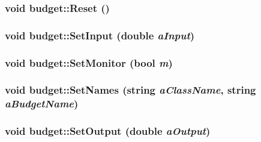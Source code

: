 \label{classbudget_a5a09b3d53e4bb109f1413b99a634b55d}
\hypertarget{classbudget_a47533e4ef9b8907303904da10f934f74}{
\subsubsection[{Reset}]{\setlength{\rightskip}{0pt plus 5cm}void budget::Reset ()}}
\label{classbudget_a47533e4ef9b8907303904da10f934f74}
\hypertarget{classbudget_a885260b83f245dee43a1e6ee70a4c68d}{
\subsubsection[{SetInput}]{\setlength{\rightskip}{0pt plus 5cm}void budget::SetInput (double {\em aInput})}}
\label{classbudget_a885260b83f245dee43a1e6ee70a4c68d}
\hypertarget{classbudget_a53c534dce354449261700e9c295d7e7e}{
\subsubsection[{SetMonitor}]{\setlength{\rightskip}{0pt plus 5cm}void budget::SetMonitor (bool {\em m})}}
\label{classbudget_a53c534dce354449261700e9c295d7e7e}
\hypertarget{classbudget_ada0ca75f0dd9d8a6d0dfd5fcbd666653}{
\subsubsection[{SetNames}]{\setlength{\rightskip}{0pt plus 5cm}void budget::SetNames (string {\em aClassName}, \/  string {\em aBudgetName})}}
\label{classbudget_ada0ca75f0dd9d8a6d0dfd5fcbd666653}
\hypertarget{classbudget_a28fc928b65aef6475ad0dee374bbb7f2}{
\subsubsection[{SetOutput}]{\setlength{\rightskip}{0pt plus 5cm}void budget::SetOutput (double {\em aOutput})}}
\label{classbudget_a28fc928b65aef6475ad0dee374bbb7f2}


